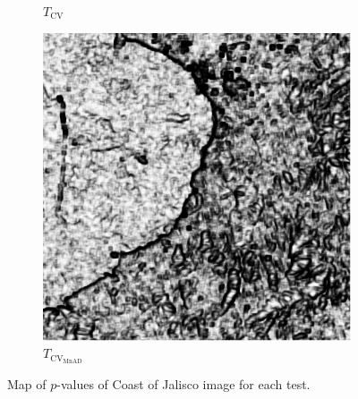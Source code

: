\documentclass[aspectratio=1610,10pt]{beamer}
\begin{document}
\begin{frame}
\begin{figure}[H]
\begin{subfigure}[b]{0.3\textwidth}
    \caption{$T_\text{CV}$}
    \label{fig:Mexico_pvalue-2}
  \end{subfigure}
  \hfill
  \begin{subfigure}[b]{0.3\textwidth}
    \centering
    \includegraphics[width=\textwidth]{../../Figures/PNG/mnad_p_values_mexico_512}
     \caption{$T_{\text{CV}_{\text{MnAD}}}$}
    \label{fig:Mexico_pvalue-3}
  \end{subfigure}
  \caption{Map of $p$-values of Coast of Jalisco image for each test. }
  \label{fig:Mexico_pvalue}
\end{figure}
\end{frame} 
\end{document}
